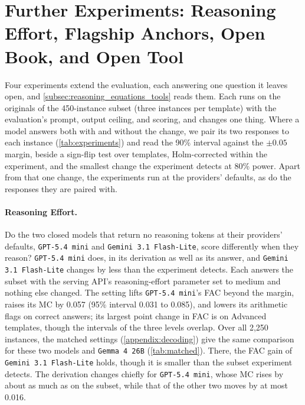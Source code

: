 \section{Further Experiments: Reasoning Effort, Flagship Anchors, Open Book, and Open Tool}
\label{appendix:experiments}

Four experiments extend the evaluation, each answering one question it leaves open, and
\autoref{subsec:reasoning_equations_tools} reads them.
Each runs on the originals of the 450-instance subset (three instances per template) with the
evaluation's prompt, output ceiling, and scoring, and changes one thing.
Where a model answers both with and without the change, we pair its two responses to each instance
(\autoref{tab:experiments}) and read the 90\% interval against the $\pm 0.05$ margin, beside a
sign-flip test over templates, Holm-corrected within the experiment, and the smallest change the
experiment detects at 80\% power.
Apart from that one change, the experiments run at the providers' defaults, as do the responses
they are paired with.

\paragraph{Reasoning Effort.} Do the two closed models that return no reasoning tokens at their
providers' defaults, \texttt{GPT-5.4 mini} and \texttt{Gemini 3.1 Flash-Lite}, score differently
when they reason?
\texttt{GPT-5.4 mini} does, in its derivation as well as its answer, and
\texttt{Gemini 3.1 Flash-Lite} changes by less than the experiment detects.
Each answers the subset with the serving API's reasoning-effort parameter set to medium and nothing
else changed.
The setting lifts \texttt{GPT-5.4 mini}'s FAC beyond the margin, raises its MC by 0.057 (95\%
interval 0.031 to 0.085), and lowers its arithmetic flags on correct answers; its largest point
change in FAC is on Advanced templates, though the intervals of the three levels overlap.
Over all 2,250 instances, the matched settings (\autoref{appendix:decoding}) give the same
comparison for these two models and \texttt{Gemma 4 26B} (\autoref{tab:matched}).
There, the FAC gain of \texttt{Gemini 3.1 Flash-Lite} holds, though it is smaller than the subset
experiment detects.
The derivation changes chiefly for \texttt{GPT-5.4 mini}, whose MC rises by about as much as on the
subset, while that of the other two moves by at most 0.016.

